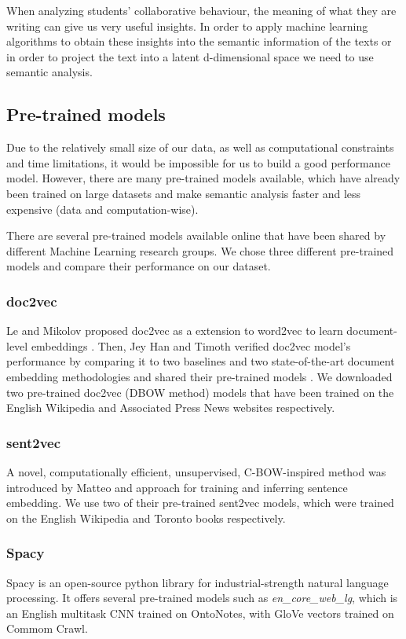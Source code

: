When analyzing students' collaborative behaviour, the meaning of what they are writing can give us very useful insights. In order to apply machine learning algorithms to obtain these insights into the semantic information of the texts or in order to project the text into a latent d-dimensional space we need to use semantic analysis.
 \subsection{Pre-trained models}
 \label{sub:pretrained}
 Due to the relatively small size of our data, as well as computational constraints and time limitations, it would be impossible for us to build a good performance model. However, there are many pre-trained models available, which have already been trained on large datasets and make semantic analysis faster and less expensive (data and computation-wise).
 
 There are several pre-trained models available online that have been shared by different Machine Learning research groups. We chose three different pre-trained models and compare their performance on our dataset.
 
 \subsubsection{doc2vec}
 Le and Mikolov proposed doc2vec as a extension to word2vec to learn document-level embeddings \cite{doc2vec}. Then, Jey Han and Timoth verified doc2vec model's performance by comparing it to two baselines and two state-of-the-art document embedding methodologies and shared their pre-trained models \cite{doc2vecPretrained}. We downloaded two pre-trained doc2vec (DBOW method) models that have been trained on the English Wikipedia and Associated Press News websites respectively. 
\subsubsection{sent2vec}
A novel, computationally efficient, unsupervised, C-BOW-inspired method was introduced by Matteo and approach for training and inferring sentence embedding\cite{sen2vec}. We use two of their pre-trained sent2vec models, which were trained on the English Wikipedia and Toronto books respectively.
\subsubsection{Spacy}
Spacy is an open-source python library for industrial-strength natural language processing. It offers several pre-trained models such as \textit{en\_core\_web\_lg}, which is an English multitask CNN trained on OntoNotes, with GloVe vectors trained on Commom Crawl.
